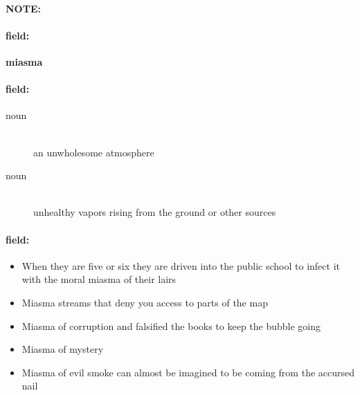 \documentclass[12pt]{article}
\newenvironment{note}{\paragraph{NOTE:}}{}
\newenvironment{field}{\paragraph{field:}}{}
\begin{document}
\begin{note}
\begin{field}
\textbf{\large miasma}
\end{field}


\begin{field}
\begin{description}
\item[noun] \hfill \\ 
an unwholesome atmosphere

\item[noun] \hfill \\ 
unhealthy vapors rising from the ground or other sources

\end{description}
\end{field}

\begin{field}
\begin{itemize}
\item When they are five or six they are driven into the public school to infect it with the moral miasma of their lairs
\item Miasma streams that deny you access to parts of the map
\item Miasma of corruption and falsified the books to keep the bubble going
\item Miasma of mystery
\item Miasma of evil smoke can almost be imagined to be coming from the accursed nail
\end{itemize}
\end{field}
\end{note}
\end{document}
